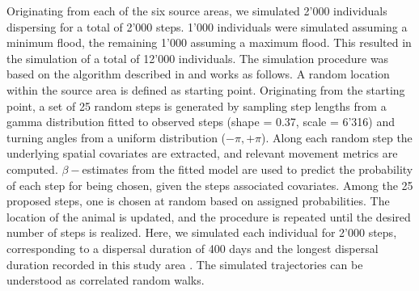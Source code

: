 \documentclass[abstract=on,10pt,a4paper,bibliography=totocnumbered]{article}
\begin{document}
Originating from each of the six source areas, we simulated 2'000 individuals
dispersing for a total of 2'000 steps. 1'000 individuals were simulated assuming
a minimum flood, the remaining 1'000 assuming a maximum flood. This resulted in
the simulation of a total of 12'000 individuals. The simulation procedure was
based on the algorithm described in  and works as follows. A
random location within the source area is defined as starting point. Originating
from the starting point, a set of 25 random steps is generated by sampling step
lengths from a gamma distribution fitted to observed steps (shape = 0.37, scale
= 6'316) and turning angles from a uniform distribution ($-\pi, +\pi$). Along
each random step the underlying spatial covariates are extracted, and relevant
movement metrics are computed. \(\beta-\)estimates from the fitted model are
used to predict the probability of each step for being chosen, given the steps
associated covariates. Among the 25 proposed steps, one is chosen at random
based on assigned probabilities. The location of the animal is updated, and the
procedure is repeated until the desired number of steps is realized. Here, we
simulated each individual for 2'000 steps, corresponding to a dispersal duration
of 400 days and the longest dispersal duration recorded in this study area
\citep{Cozzi.2020, Hofmann.2021}. The simulated trajectories can be understood
as correlated random walks.
\end{document}
